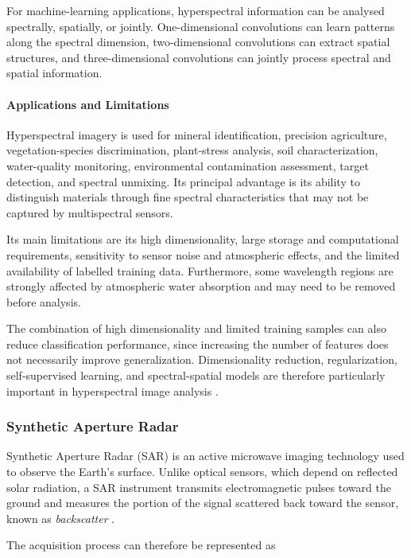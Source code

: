 \documentclass[11pt,a4paper]{article}
\begin{document}
For machine-learning applications, hyperspectral information can be
analysed spectrally, spatially, or jointly. One-dimensional convolutions
can learn patterns along the spectral dimension, two-dimensional
convolutions can extract spatial structures, and three-dimensional
convolutions can jointly process spectral and spatial information.

\paragraph{Applications and Limitations}

Hyperspectral imagery is used for mineral identification, precision
agriculture, vegetation-species discrimination, plant-stress analysis,
soil characterization, water-quality monitoring, environmental
contamination assessment, target detection, and spectral unmixing. Its
principal advantage is its ability to distinguish materials through
fine spectral characteristics that may not be captured by multispectral
sensors.

Its main limitations are its high dimensionality, large storage and
computational requirements, sensitivity to sensor noise and atmospheric
effects, and the limited availability of labelled training data.
Furthermore, some wavelength regions are strongly affected by atmospheric
water absorption and may need to be removed before analysis.

The combination of high dimensionality and limited training samples can
also reduce classification performance, since increasing the number of
features does not necessarily improve generalization. Dimensionality
reduction, regularization, self-supervised learning, and spectral-spatial
models are therefore particularly important in hyperspectral image
analysis \cite{bioucasdias2013hyperspectral}.

\subsubsection{Synthetic Aperture Radar}

Synthetic Aperture Radar (SAR) is an active microwave imaging technology
used to observe the Earth's surface. Unlike optical sensors, which depend
on reflected solar radiation, a SAR instrument transmits electromagnetic
pulses toward the ground and measures the portion of the signal scattered
back toward the sensor, known as \textit{backscatter}
\cite{moreira2013sar}.

The acquisition process can therefore be represented as
\end{document}
